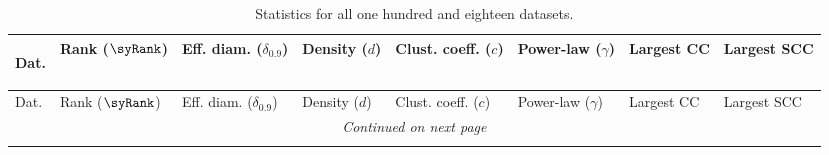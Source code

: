 
\begin{longtable}{ llllllll }

\caption[Statistics for all one hundred and eighteen datasets]{Statistics for all one hundred and eighteen datasets.}  \\


\label{tab:results-stat}

Dat.                       & Rank ($\syRank$) & Eff. diam. ($\delta\ensuremath{_{\textrm{0.9}}}$) & Density ($d$) & Clust. coeff. ($c$) & Power-law ($\gamma$) & Largest CC & Largest SCC \\ 
\hline

\endfirsthead


\hline
Dat.                       & Rank ($\syRank$) & Eff. diam. ($\delta\ensuremath{_{\textrm{0.9}}}$) & Density ($d$) & Clust. coeff. ($c$) & Power-law ($\gamma$) & Largest CC & Largest SCC \\ 
\hline

\endhead

\hline
\multicolumn{8}{c}{\textit{Continued on next page}} \\* 
\hline

\endfoot

\hline \hline
\endlastfoot


\end{longtable}
